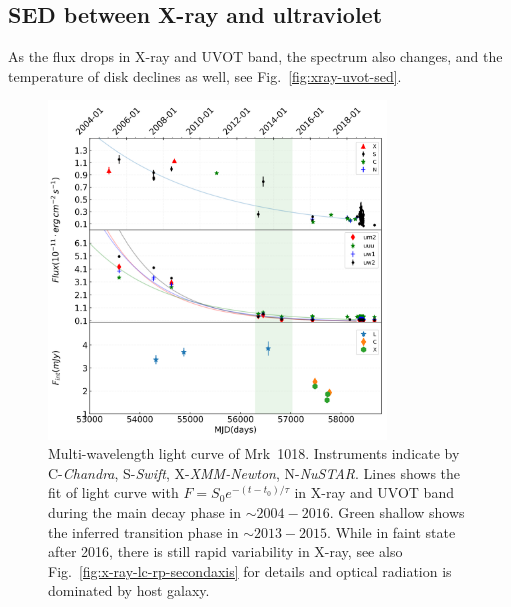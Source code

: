 \documentclass[twocolumn]{aastex63}
\newcommand{\xmm}{{\em XMM-Newton}}
\newcommand{\nustar}{{\em NuSTAR}}
\newcommand{\chandra}{{\em Chandra}}
\newcommand{\swift}{{\em Swift}}
\begin{document}
\subsection{SED between X-ray and ultraviolet}\label{subsec:xray-uvot-sed}
As the flux drops in X-ray and UVOT band, the spectrum also changes, and the temperature of disk declines as well, see Fig.~\ref{fig:xray-uvot-sed}.




\begin{figure}
\centering
	\includegraphics[width=0.8\textwidth]{./pic/subplots-xrt_uvot-radio-second.png}
    \caption{Multi-wavelength light curve of Mrk~1018. Instruments indicate by C-\chandra, S-\swift, X-\xmm, N-\nustar. Lines shows the fit of light curve with $F=S_0 e^{-(t-t_0)/\tau }$ in X-ray and UVOT band during the main decay phase in $\sim2004-2016$. Green shallow shows the inferred transition phase in $\sim2013-2015$.  While in faint state after 2016, there is still rapid variability in X-ray, see also Fig.~\ref{fig:x-ray-lc-rp-secondaxis} for details and optical radiation is dominated by host galaxy.}
    \label{fig:multi-lc-secondaxis}
\end{figure}
\end{document}
